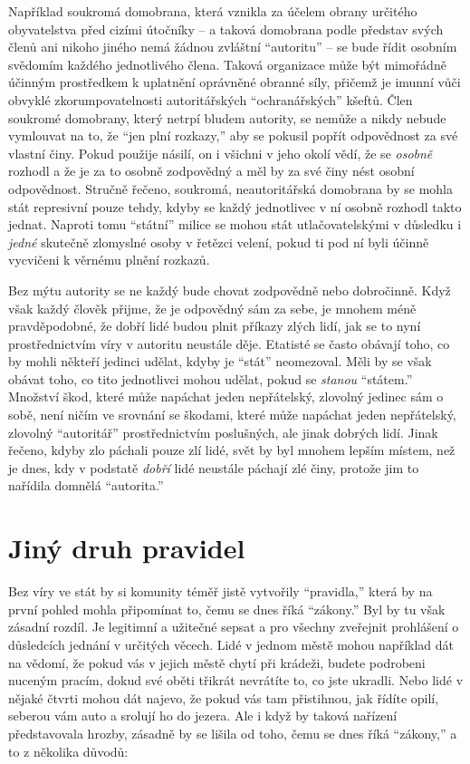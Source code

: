 \documentclass{book}
\begin{document}
Například soukromá domobrana, která vznikla za účelem obrany určitého obyvatelstva před cizími útočníky -- a taková domobrana podle představ svých členů ani nikoho jiného nemá žádnou zvláštní \enquote{autoritu} -- se bude řídit osobním svědomím každého jednotlivého člena. Taková organizace může být mimořádně účinným prostředkem k uplatnění oprávněné obranné síly, přičemž je imunní vůči obvyklé zkorumpovatelnosti autoritářských \enquote{ochranářských} kšeftů. Člen soukromé domobrany, který netrpí bludem autority, se nemůže a nikdy nebude vymlouvat na to, že \enquote{jen plní rozkazy,} aby se pokusil popřít odpovědnost za své vlastní činy. Pokud použije násilí, on i všichni v jeho okolí vědí, že se \emph{osobně} rozhodl a že je za to osobně zodpovědný a měl by za své činy nést osobní odpovědnost. Stručně řečeno, soukromá, neautoritářská domobrana by se mohla stát represivní pouze tehdy, kdyby se každý jednotlivec v ní osobně rozhodl takto jednat. Naproti tomu \enquote{státní} milice se mohou stát utlačovatelskými v důsledku i \emph{jedné} skutečně zlomyslné osoby v řetězci velení, pokud ti pod ní byli účinně vycvičeni k věrnému plnění rozkazů.

Bez mýtu autority se ne každý bude chovat zodpovědně nebo dobročinně. Když však každý člověk přijme, že je odpovědný sám za sebe, je mnohem méně pravděpodobné, že dobří lidé budou plnit příkazy zlých lidí, jak se to nyní prostřednictvím víry v autoritu neustále děje. Etatisté se často obávají toho, co by mohli někteří jedinci udělat, kdyby je \enquote{stát} neomezoval. Měli by se však obávat toho, co tito jednotlivci mohou udělat, pokud se \emph{stanou} \enquote{státem.} Množství škod, které může napáchat jeden nepřátelský, zlovolný jedinec sám o sobě, není ničím ve srovnání se škodami, které může napáchat jeden nepřátelský, zlovolný \enquote{autoritář} prostřednictvím poslušných, ale jinak dobrých lidí. Jinak řečeno, kdyby zlo páchali pouze zlí lidé, svět by byl mnohem lepším místem, než je dnes, kdy v podstatě \emph{dobří} lidé neustále páchají zlé činy, protože jim to nařídila domnělá \enquote{autorita.}

\section{Jiný druh pravidel}

Bez víry ve stát by si komunity téměř jistě vytvořily \enquote{pravidla,} která by na první pohled mohla připomínat to, čemu se dnes říká \enquote{zákony.} Byl by tu však zásadní rozdíl. Je legitimní a užitečné sepsat a pro všechny zveřejnit prohlášení o důsledcích jednání v určitých věcech. Lidé v jednom městě mohou například dát na vědomí, že pokud vás v jejich městě chytí při krádeži, budete podrobeni nuceným pracím, dokud své oběti třikrát nevrátíte to, co jste ukradli. Nebo lidé v nějaké čtvrti mohou dát najevo, že pokud vás tam přistihnou, jak řídíte opilí, seberou vám auto a srolují ho do jezera. Ale i když by taková nařízení představovala hrozby, zásadně by se lišila od toho, čemu se dnes říká \enquote{zákony,} a to z několika důvodů:
\end{document}

